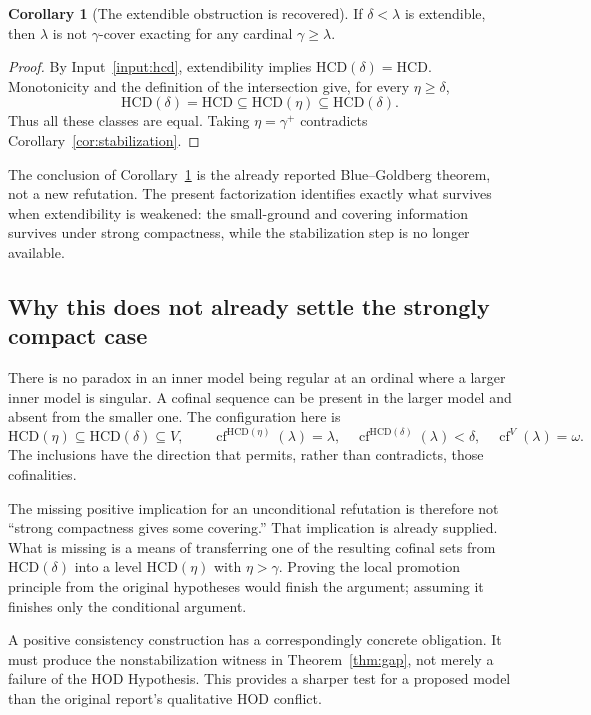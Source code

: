 \documentclass[11pt,letterpaper]{article}
\theoremstyle{definition}
\newtheorem{corollary}[definition]{Corollary}
\newcommand{\cf}{\operatorname{cf}}
\newcommand{\HCD}{\mathrm{HCD}}
\theoremstyle{remark}
\begin{document}
\begin{corollary}[The extendible obstruction is recovered]\label{cor:extendible}
If $\delta<\lambda$ is extendible, then $\lambda$ is not $\gamma$-cover exacting for any cardinal $\gamma\geq\lambda$.
\end{corollary}

\begin{proof}
By Input~\ref{input:hcd}, extendibility implies
$\HCD(\delta)=\HCD$. Monotonicity and the definition of the intersection give, for every $\eta\geq\delta$,
\[
 \HCD(\delta)=\HCD\subseteq\HCD(\eta)\subseteq\HCD(\delta).
\]
Thus all these classes are equal. Taking $\eta=\gamma^+$ contradicts Corollary~\ref{cor:stabilization}.
\end{proof}

The conclusion of Corollary~\ref{cor:extendible} is the already reported Blue--Goldberg theorem, not a new refutation. The present factorization identifies exactly what survives when extendibility is weakened: the small-ground and covering information survives under strong compactness, while the stabilization step is no longer available.\cite[Theorem 3.6]{cover}\cite[Theorems 4.14--4.15]{unique}

\subsection{Why this does not already settle the strongly compact case}

There is no paradox in an inner model being regular at an ordinal where a larger inner model is singular. A cofinal sequence can be present in the larger model and absent from the smaller one. The configuration here is
\[
 \HCD(\eta)\subseteq\HCD(\delta)\subseteq V,
 \qquad
 \cf^{\HCD(\eta)}(\lambda)=\lambda,
 \quad \cf^{\HCD(\delta)}(\lambda)<\delta,
 \quad \cf^V(\lambda)=\omega.
\]
The inclusions have the direction that permits, rather than contradicts, those cofinalities.

The missing positive implication for an unconditional refutation is therefore not ``strong compactness gives some covering.'' That implication is already supplied. What is missing is a means of transferring one of the resulting cofinal sets from $\HCD(\delta)$ into a level $\HCD(\eta)$ with $\eta>\gamma$. Proving the local promotion principle from the original hypotheses would finish the argument; assuming it finishes only the conditional argument.

A positive consistency construction has a correspondingly concrete obligation. It must produce the nonstabilization witness in Theorem~\ref{thm:gap}, not merely a failure of the HOD Hypothesis. This provides a sharper test for a proposed model than the original report's qualitative HOD conflict.
\end{document}
